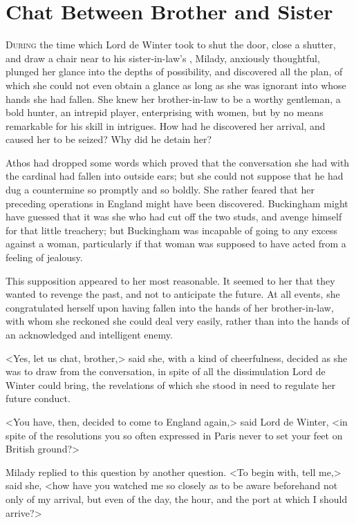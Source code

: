 
\chapter{Chat Between Brother and Sister}

\lettrine{D}{uring} the time which Lord de Winter took to shut the door, close a shutter, and draw a chair near to his sister-in-law's , Milady, anxiously thoughtful, plunged her glance into the depths of possibility, and discovered all the plan, of which she could not even obtain a glance as long as she was ignorant into whose hands she had fallen. She knew her brother-in-law to be a worthy gentleman, a bold hunter, an intrepid player, enterprising with women, but by no means remarkable for his skill in intrigues. How had he discovered her arrival, and caused her to be seized? Why did he detain her? 

Athos had dropped some words which proved that the conversation she had with the cardinal had fallen into outside ears; but she could not suppose that he had dug a countermine so promptly and so boldly. She rather feared that her preceding operations in England might have been discovered. Buckingham might have guessed that it was she who had cut off the two studs, and avenge himself for that little treachery; but Buckingham was incapable of going to any excess against a woman, particularly if that woman was supposed to have acted from a feeling of jealousy. 

This supposition appeared to her most reasonable. It seemed to her that they wanted to revenge the past, and not to anticipate the future. At all events, she congratulated herself upon having fallen into the hands of her brother-in-law, with whom she reckoned she could deal very easily, rather than into the hands of an acknowledged and intelligent enemy. 

<Yes, let us chat, brother,> said she, with a kind of cheerfulness, decided as she was to draw from the conversation, in spite of all the dissimulation Lord de Winter could bring, the revelations of which she stood in need to regulate her future conduct. 

<You have, then, decided to come to England again,> said Lord de Winter, <in spite of the resolutions you so often expressed in Paris never to set your feet on British ground?> 

Milady replied to this question by another question. <To begin with, tell me,> said she, <how have you watched me so closely as to be aware beforehand not only of my arrival, but even of the day, the hour, and the port at which I should arrive?> 

